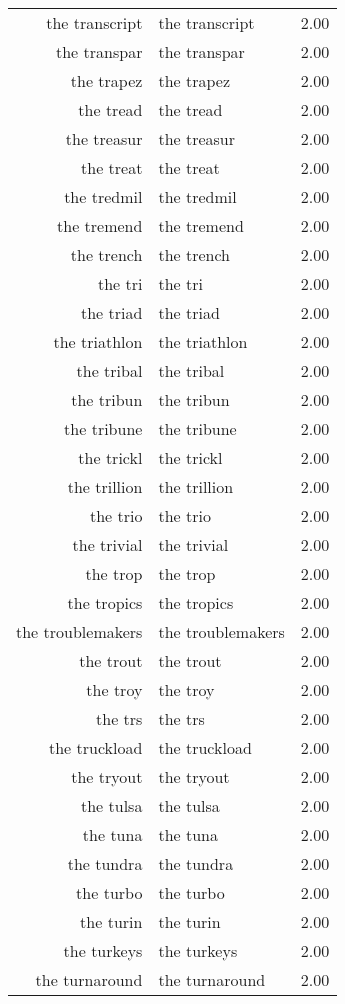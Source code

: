 \begin{table}[ht]
\begin{tabular}{rlr}
  the transcript & the transcript & 2.00 \\ 
  the transpar & the transpar & 2.00 \\ 
  the trapez & the trapez & 2.00 \\ 
  the tread & the tread & 2.00 \\ 
  the treasur & the treasur & 2.00 \\ 
  the treat & the treat & 2.00 \\ 
  the tredmil & the tredmil & 2.00 \\ 
  the tremend & the tremend & 2.00 \\ 
  the trench & the trench & 2.00 \\ 
  the tri & the tri & 2.00 \\ 
  the triad & the triad & 2.00 \\ 
  the triathlon & the triathlon & 2.00 \\ 
  the tribal & the tribal & 2.00 \\ 
  the tribun & the tribun & 2.00 \\ 
  the tribune & the tribune & 2.00 \\ 
  the trickl & the trickl & 2.00 \\ 
  the trillion & the trillion & 2.00 \\ 
  the trio & the trio & 2.00 \\ 
  the trivial & the trivial & 2.00 \\ 
  the trop & the trop & 2.00 \\ 
  the tropics & the tropics & 2.00 \\ 
  the troublemakers & the troublemakers & 2.00 \\ 
  the trout & the trout & 2.00 \\ 
  the troy & the troy & 2.00 \\ 
  the trs & the trs & 2.00 \\ 
  the truckload & the truckload & 2.00 \\ 
  the tryout & the tryout & 2.00 \\ 
  the tulsa & the tulsa & 2.00 \\ 
  the tuna & the tuna & 2.00 \\ 
  the tundra & the tundra & 2.00 \\ 
  the turbo & the turbo & 2.00 \\ 
  the turin & the turin & 2.00 \\ 
  the turkeys & the turkeys & 2.00 \\ 
  the turnaround & the turnaround & 2.00 \\ 

\end{tabular}
\end{table}
